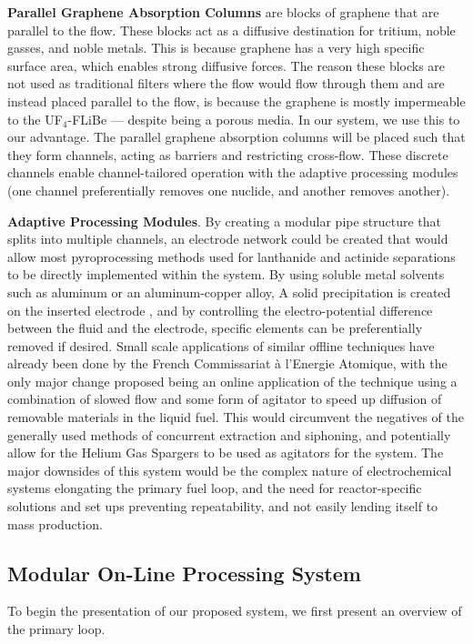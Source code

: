 \documentclass{anstrans}
\begin{document}
\textbf{Parallel Graphene Absorption Columns} are blocks of graphene that are parallel to the flow. These blocks act as a diffusive destination for tritium, noble gasses, and noble metals. This is because graphene has a very high specific surface area, which enables strong diffusive forces. The reason these blocks are not used as traditional filters where the flow would flow through them and are instead placed parallel to the flow, is because the graphene is mostly impermeable to the UF$_4$-FLiBe --- despite being a porous media. In our system, we use this to our advantage. The parallel graphene absorption columns will be placed such that they form channels, acting as barriers and restricting cross-flow. These discrete channels enable channel-tailored operation with the adaptive processing modules (one channel preferentially removes one nuclide, and another removes another).  \newline

\textbf{Adaptive Processing Modules}. By creating a modular pipe structure that splits into multiple channels, an electrode network could be created that would allow most pyroprocessing methods used for lanthanide and actinide separations to be directly implemented within the system. By using soluble metal solvents such as aluminum or an aluminum-copper alloy, A solid precipitation is created on the inserted electrode \cite{NRCPyro}, and by controlling the electro-potential difference between the fluid and the electrode, specific elements can be preferentially removed if desired. Small scale applications of similar offline techniques have already been done by the French Commissariat à l’Energie Atomique, with the only major change proposed being an online application of the technique using a combination of slowed flow and some form of agitator to speed up diffusion of removable materials in the liquid fuel. This would circumvent the negatives of the generally used methods of concurrent extraction and siphoning, and potentially allow for the Helium Gas Spargers to be used as agitators for the system. The major downsides of this system would be the complex nature of electrochemical systems elongating the primary fuel loop, and the need for reactor-specific solutions and set ups preventing repeatability, and not easily lending itself to mass production.

\subsection{Modular On-Line Processing System}\label{omps}
To begin the presentation of our proposed system, we first present an overview of the primary loop. 
\end{document}
